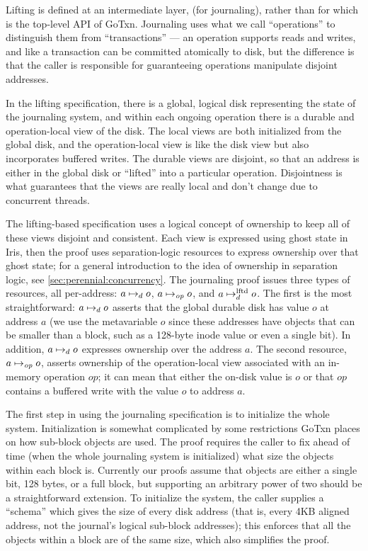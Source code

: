 Lifting is defined at an intermediate layer,  (for journaling), rather
than for  which is the top-level API of GoTxn. Journaling uses what we
call ``operations'' to distinguish them from ``transactions'' --- an operation
supports reads and writes, and like a transaction can be committed atomically to
disk, but the difference is that the caller is responsible for guaranteeing
operations manipulate disjoint addresses.

In the lifting specification, there is a global, logical disk representing the
state of the journaling system, and within each ongoing operation there is a
durable and operation-local view of the disk. The local views are both
initialized from the global disk, and the operation-local view is like the disk
view but also incorporates buffered writes. The durable views are disjoint, so
that an address is either in the global disk or ``lifted'' into a particular
operation. Disjointness is what guarantees that the views are really local and
don't change due to concurrent threads.

The lifting-based specification uses a logical concept of ownership to keep all
of these views disjoint and consistent. Each view is expressed using ghost state
in Iris, then the proof uses separation-logic resources to express ownership over that
ghost state; for a general introduction to the idea of
ownership in separation logic, see \cref{sec:perennial:concurrency}. The
journaling proof issues three types of resources, all per-address:
$a \mapsto_d o$, $a \mapsto_{\mathit{op}} o$, and $a \mapsto_d^{\mathrm{lftd}} o$. The first is the most
straightforward: $a \mapsto_d o$ asserts that the global durable disk has
value $o$ at address $a$ (we use the metavariable $o$ since these addresses have
objects that can be smaller than a block, such as a 128-byte inode value or even
a single bit). In addition, $a \mapsto_d o$ expresses ownership over the
address $a$. The second resource, $a \mapsto_{\mathit{op}} o$, asserts ownership of the
operation-local view associated with an in-memory operation $\mathit{op}$; it
can mean that either the on-disk value is $o$ or that $\mathit{op}$ contains a
buffered write with the value $o$ to address $a$.

The first step in using the journaling specification is to initialize the whole
system. Initialization is somewhat complicated by some restrictions GoTxn places
on how sub-block objects are used. The proof requires the caller to fix ahead of
time (when the whole journaling system is initialized) what size the objects
within each block is. Currently our proofs assume that objects are either a single bit, 128
bytes, or a full block, but supporting an arbitrary power of two should be a
straightforward extension. To initialize the system, the caller supplies a
``schema'' which gives the size of every disk address (that is, every 4KB
aligned address, not the journal's logical sub-block addresses); this enforces
that all the objects within a block are of the same size, which also simplifies
the proof.

